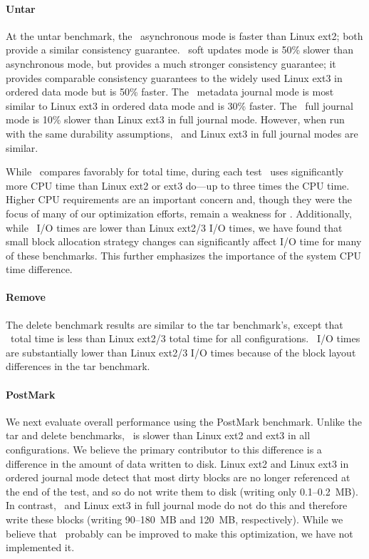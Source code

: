 \benchtable{}

\paragraph{Untar}
%
At the untar benchmark, the \Kudos\ asynchronous mode is faster than
Linux ext2; both provide a similar consistency guarantee.
%
\Kudos\ soft updates mode is 50\% slower than asynchronous mode, but
provides a much stronger consistency guarantee; it provides comparable
consistency guarantees to the widely used Linux ext3 in ordered data
mode but is 50\% faster.
%
The \Kudos\ metadata journal mode is most similar to Linux ext3 in
ordered data mode and is 30\% faster.
%
The \Kudos\ full journal mode is 10\% slower than Linux ext3 in full
journal mode.
%
However, when run with the same durability assumptions, \Kudos\ and
Linux ext3 in full journal modes are similar.

While \Kudos\ compares favorably for total time, during each test
\Kudos\ uses significantly more CPU time than Linux ext2 or ext3
do---up to three times the CPU time.
%
Higher CPU requirements are an important concern and, though they were
the focus of many of our optimization efforts, remain a weakness
for \Kudos.
%
Additionally, while \Kudos\ I/O times are lower than Linux ext2/3 I/O
times, we have found that small block allocation strategy changes can
significantly affect I/O time for many of these benchmarks. This further
emphasizes the importance of the system CPU time difference.


\paragraph{Remove}
%
The delete benchmark results are similar to the tar benchmark's,
except that \Kudos\ total time is less than Linux ext2/3 total time
for all configurations. \Kudos\ I/O times are substantially lower
than Linux ext2/3 I/O times because of the block layout differences in
the tar benchmark.

\paragraph{PostMark}
%
We next evaluate overall performance using the PostMark benchmark.
Unlike the tar and delete benchmarks, \Kudos\ is slower than Linux
ext2 and ext3 in all configurations.
%
We believe the primary contributor to this difference is a difference
in the amount of data written to disk. Linux ext2 and Linux ext3 in
ordered journal mode detect that most dirty blocks are no longer
referenced at the end of the test, and so do not write them to disk
(writing only 0.1--0.2~MB). In contrast, \Kudos\ and Linux ext3 in
full journal mode do not do this and therefore write these blocks
(writing 90--180~MB and 120~MB, respectively).
%
While we believe that \Kudos\ probably can be improved to make this
optimization, we have not implemented it.
%

